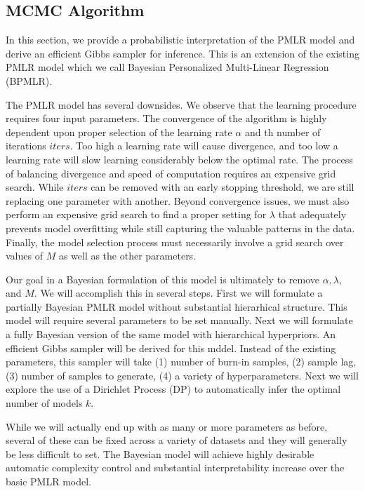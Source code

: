 \documentclass[10pt]{proc}
\begin{document}
\subsection{MCMC Algorithm}

In this section, we provide a probabilistic interpretation of the PMLR model and
derive an efficient Gibbs sampler for inference. This is an extension of the
existing PMLR model which we call Bayesian Personalized Multi-Linear Regression
(BPMLR).

The PMLR model has several downsides. We observe that the learning
procedure requires four input parameters. The convergence of the algorithm is
highly dependent upon proper selection of the learning rate $\alpha$ and th
number of iterations $iters$. Too high a learning rate will cause divergence,
and too low a learning rate will slow learning considerably below the optimal
rate. The process of balancing divergence and speed of computation requires an
expensive grid search. While $iters$ can be removed with an early stopping
threshold, we are still replacing one parameter with another. Beyond convergence
issues, we must also perform an expensive grid search to find a proper setting
for $\lambda$ that adequately prevents model overfitting while still capturing
the valuable patterns in the data. Finally, the model selection process must
necessarily involve a grid search over values of $M$ as well as the other
parameters.

Our goal in a Bayesian formulation of this model is ultimately to remove
$\alpha, \lambda,$ and $M$. We will accomplish this in several steps. First we
will formulate a partially Bayesian PMLR model without substantial hierarhical
structure. This model will require several parameters to be set manually. Next
we will formulate a fully Bayesian version of the same model with hierarchical
hyperpriors. An efficient Gibbs sampler will be derived for this mddel. Instead
of the existing parameters, this sampler will take (1) number of burn-in
samples, (2) sample lag, (3) number of samples to generate, (4) a variety of
hyperparameters. Next we will explore the use of a Dirichlet Process (DP) to
automatically infer the optimal number of models $k$.

While we will actually end up with as many or more parameters as before, several
of these can be fixed across a variety of datasets and they will generally be
less difficult to set. The Bayesian model will achieve highly desirable
automatic complexity control and substantial interpretability increase over the
basic PMLR model.
\end{document}
